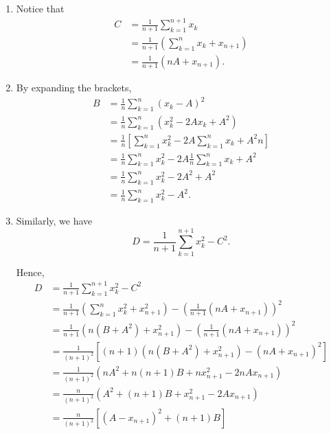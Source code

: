 \Question{\currfilebase}

\begin{enumerate}
    \item Notice that
          \begin{align*}
              C & = \frac{1}{n + 1} \sum_{k = 1}^{n + 1} x_k                      \\
                & = \frac{1}{n + 1} \left(\sum_{k = 1}^{n} x_k + x_{n + 1}\right) \\
                & = \frac{1}{n + 1} \left(n A + x_{n + 1}\right).
          \end{align*}

    \item By expanding the brackets,
          \begin{align*}
              B & = \frac{1}{n} \sum_{k = 1}^{n} (x_k - A)^2                                           \\
                & = \frac{1}{n} \sum_{k = 1}^{n} (x_k^2 - 2Ax_k + A^2)                                 \\
                & = \frac{1}{n} \left[\sum_{k = 1}^{n} x_k^2 - 2A \sum_{k = 1}^{n} x_k + A^2 n \right] \\
                & = \frac{1}{n} \sum_{k = 1}^{n} x_k^2 - 2A \frac{1}{n} \sum_{k = 1}^{n} x_k + A^2     \\
                & = \frac{1}{n} \sum_{k = 1}^{n} x_k^2 - 2A^2 + A^2                                    \\
                & = \frac{1}{n} \sum_{k = 1}^{n} x_k^2 - A^2.
          \end{align*}

    \item Similarly, we have
          \[
              D = \frac{1}{n + 1} \sum_{k = 1}^{n + 1} x_k^2 - C^2.
          \]

          Hence,
          \begin{align*}
              D & = \frac{1}{n + 1} \sum_{k = 1}^{n + 1} x_k^2 - C^2                                                                    \\
                & = \frac{1}{n + 1} \left(\sum_{k = 1}^{n} x_k^2 + x_{n + 1}^2\right) - \left(\frac{1}{n + 1} (nA + x_{n + 1})\right)^2 \\
                & = \frac{1}{n + 1} \left(n (B + A^2) + x_{n + 1}^2\right) - \left(\frac{1}{n + 1} (nA + x_{n + 1})\right)^2            \\
                & = \frac{1}{(n + 1)^2} \left[(n + 1)\left(n (B + A^2) + x_{n + 1}^2\right) - (nA + x_{n + 1})^2\right]                 \\
                & = \frac{1}{(n + 1)^2} \left(n A^2 + n(n + 1)B + n x_{n + 1}^2 - 2nA x_{n + 1}\right)                                  \\
                & = \frac{n}{(n + 1)^2} \left(A^2 + (n + 1)B + x_{n + 1}^2 - 2A x_{n + 1}\right)                                        \\
                & = \frac{n}{(n + 1)^2} \left[\left(A - x_{n + 1}\right)^2 + (n + 1)B\right]
          \end{align*}


\end{enumerate}
